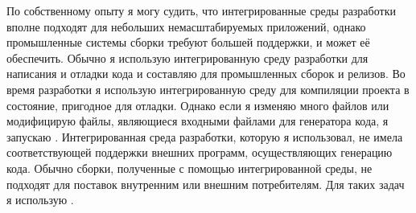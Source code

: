 По собственному опыту я могу судить, что интегрированные среды
разработки вполне подходят для небольших немасштабируемых приложений,
однако промышленные системы сборки требуют большей поддержки,
и \GNUmake{} может её обеспечить. Обычно я использую интегрированную
среду разработки для написания и отладки кода и составляю \Makefile{}
для промышленных сборок и релизов. Во время разработки я использую
интегрированную среду для компиляции проекта в состояние, пригодное
для отладки. Однако если я изменяю много файлов или модифицирую файлы,
являющиеся входными файлами для генератора кода, я запускаю
\Makefile{}. Интегрированная среда разработки, которую я использовал,
не имела соответствующей поддержки внешних программ, осуществляющих
генерацию кода. Обычно сборки, полученные с помощью интегрированной
среды, не подходят для поставок внутренним или внешним потребителям.
Для таких задач я использую \GNUmake{}.
